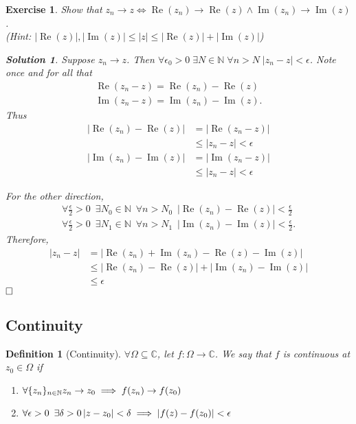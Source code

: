 \documentclass[11pt, oneside]{book}
\theoremstyle{break}
\newtheorem*{solution}{Solution}
\newtheorem{ex}{Exercise}[section]
\newtheorem{defn}{Definition}[section]
\DeclareMathOperator{\re}{Re}
\DeclareMathOperator{\im}{Im}
\newcommand{\qed}{\hfill\ensuremath{\square}}   %
\newcommand{\abs}[1]{\left|#1\right|}						%
\begin{document}
\begin{ex}\label{ex:convergence in complex iff convergence of real and imaginary parts in real}
	Show that $z_n \to z \iff \re(z_n) \to \re(z) \land \im(z_n) \to \im(z)$. \\
	(Hint: $\abs{\re(z)}, \abs{\im(z)} \leq \abs{z} \leq \abs{\re(z)} + \abs{\im(z)}$)

	\begin{solution}
		Suppose $z_n \to z$. Then $\forall \epsilon_0 > 0 \; \exists N \in \mathbb{N} \; \forall n > N \; \abs{z_n - z} < \epsilon$. Note once and for all that
		\begin{gather*}
			\re(z_n - z) = \re(z_n) - \re(z) \\
			\im(z_n - z) = \im(z_n) - \im(z).
		\end{gather*}
		Thus
		\begin{align*}
			\abs{\re(z_n) - \re(z)} &= \abs{\re(z_n - z)} \\
					&\leq \abs{z_n - z} < \epsilon \\
			\abs{\im(z_n) - \im(z)} &= \abs{\im(z_n - z)} \\
					&\leq \abs{z_n - z} < \epsilon
		\end{align*}

		For the other direction,
		\begin{gather*}
			\forall \frac{\epsilon}{2} > 0 \enspace \exists N_0 \in \mathbb{N} \enspace \forall n > N_0 \enspace \abs{\re(z_n) - \re(z)} < \frac{\epsilon}{2} \\
			\forall \frac{\epsilon}{2} > 0 \enspace \exists N_1 \in \mathbb{N} \enspace \forall n > N_1 \enspace \abs{\im(z_n) - \im(z)} < \frac{\epsilon}{2}.
		\end{gather*}
		Therefore,
		\begin{align*}
			\abs{z_n - z} &= \abs{\re(z_n) + \im(z_n) - \re(z) - \im(z)} \\
				&\leq \abs{\re(z_n) - \re(z)} + \abs{\im(z_n) - \im(z)} \\
				&\leq \epsilon
		\end{align*}
		$\qed$
	\end{solution}
\end{ex}


\subsection{Continuity} %
\label{sub:continuity}

\begin{defn}[Continuity]\label{defn:Continuity}
	$\forall \Omega \subseteq \mathbb{C}$, let $f: \Omega \to \mathbb{C}$. We say that $f$ is continuous at $z_0 \in \Omega$ if
	\begin{enumerate}
		\item $\forall \{z_n\}_{n \in \mathbb{N}} \\
				z_n \to z_0 \implies f(z_n) \to f(z_0)$
		\item $\forall \epsilon > 0 \enspace \exists \delta > 0 \\
				\abs{z - z_0} < \delta \implies \abs{f(z) - f(z_0)} < \epsilon$
	\end{enumerate}
\end{defn}
\end{document}
